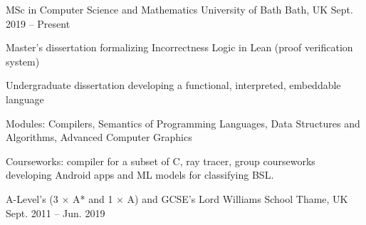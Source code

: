 


\begin{cventries}


\cventry
{MSc in Computer Science and Mathematics} %
{University of Bath} %
{Bath, UK} %
{Sept. 2019 -- Present} %
{ %
\begin{cvitems}
\item {Master's dissertation formalizing Incorrectness Logic in Lean (proof verification system)}
\item {Undergraduate dissertation developing a functional, interpreted, embeddable language}
\item {Modules: Compilers, Semantics of Programming Languages, 
  Data Structures and Algorithms, Advanced Computer Graphics}
\item {Courseworks: compiler for a subset of C, ray tracer, group 
  courseworks developing Android apps and ML models for classifying BSL.}
\end{cvitems}
}

\cventryTwo
{A-Level's (3 $\times$ A* and 1 $\times$ A) and GCSE's} %
{Lord Williams School} %
{Thame, UK} %
{Sept. 2011 -- Jun. 2019} %


\end{cventries}
